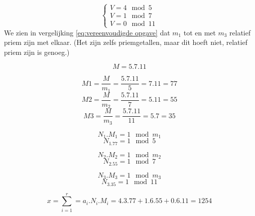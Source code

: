 \documentclass[12pt]{article}
\begin{document}
    \begin{equation} \label{eq:vereenvoudigde opgave}
        \begin{cases}
            V = 4 \mod 5 \\
            V = 1 \mod 7 \\
            V = 0 \mod 11
        \end{cases}
    \end{equation}
    We zien in vergelijking \ref{eq:vereenvoudigde opgave} dat $m_1$ tot en met $m_3$ relatief priem zijn met elkaar. (Het zijn zelfs priemgetallen, maar dit hoeft niet, relatief priem zijn is genoeg.)
    
    \begin{equation}
        M = 5.7.11
    \end{equation}
    
    \begin{equation}
        M1 = \frac{M}{m_1} = \frac{5.7.11}{5} = 7.11 = 77
    \end{equation}
    \begin{equation}
        M2 = \frac{M}{m_2} = \frac{5.7.11}{7} = 5.11 = 55
    \end{equation}
    \begin{equation}
        M3 = \frac{M}{m_3} = \frac{5.7.11}{11} = 5.7 = 35
    \end{equation}
    
    \begin{equation}
        N_1.M_1 = 1 \mod m_1
    \end{equation}
    \begin{equation}
        N_1.77 = 1 \mod 5
    \end{equation}
    
    \begin{equation}
        N_2.M_2 = 1 \mod m_2
    \end{equation}
    \begin{equation}
        N_2.55 = 1 \mod 7
    \end{equation}
    
    \begin{equation}
        N_3.M_3 = 1 \mod m_3
    \end{equation}
    \begin{equation}
        N_3.35 = 1 \mod 11
    \end{equation}
    
    \begin{equation}
        x = \sum_{i=1}^{r} = a_i.N_i.M_i = 4.3.77 + 1.6.55 + 0.6.11 = 1254
    \end{equation}
    
\end{document}
